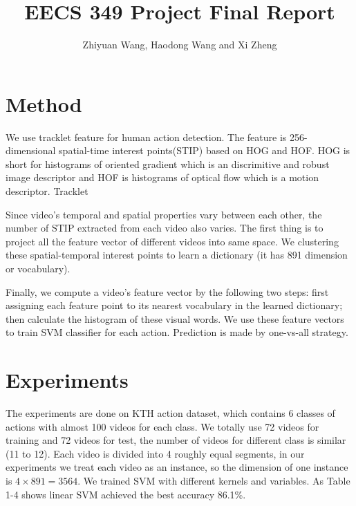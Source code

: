 \documentclass{article}
\begin{document}
\title{EECS 349 Project Final Report}
\author{Zhiyuan Wang, Haodong Wang and Xi Zheng}
\maketitle
\section{Method}
We use tracklet feature for human action detection. The feature is 256-dimensional spatial-time interest points(STIP) based on HOG and HOF. HOG is short for histograms of oriented gradient which is an discrimitive and robust image descriptor and HOF is histograms of optical flow which is a motion descriptor.  Tracklet

Since video's temporal and spatial properties vary between each other, the number of STIP extracted from each video also varies. The first thing is to project all the feature vector of different videos into same space. We clustering these spatial-temporal interest points to learn a dictionary (it has 891 dimension or vocabulary). 

Finally, we compute a video's feature vector by the following two steps: first assigning each feature point to its nearest vocabulary in the learned dictionary; then calculate the histogram of these visual words. We use these feature vectors to train SVM classifier for each action. Prediction is made by one-vs-all strategy. 
\section{Experiments}
The experiments are done on KTH action dataset, which contains 6 classes of actions with almost 100 videos for each class. We totally use 72 videos for training and 72 videos for test, the number of videos for different class is similar (11 to 12). Each video is divided into 4 roughly equal segments, in our experiments we treat each video as an instance, so the dimension of one instance is $4\times 891 = 3564$. We trained SVM with different kernels and variables. As Table 1-4 shows linear SVM achieved the best accuracy 86.1\%.
\end{document}
